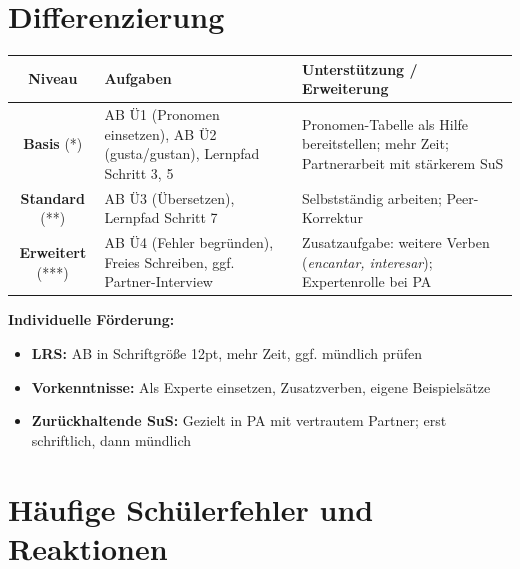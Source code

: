 \documentclass[10pt, a4paper]{article}
\newcommand{\es}[1]{\textcolor{spanisch}{\textit{#1}}}
\begin{document}

\section{Differenzierung}

\begin{tabularx}{\textwidth}{|c|X|X|}
    \hline
    \textbf{Niveau} & \textbf{Aufgaben} & \textbf{Unterstützung / Erweiterung} \\
    \hline
    \textbf{Basis} (*) & AB Ü1 (Pronomen einsetzen), AB Ü2 (gusta/gustan), Lernpfad Schritt 3, 5 &
    Pronomen-Tabelle als Hilfe bereitstellen; mehr Zeit; Partnerarbeit mit stärkerem SuS \\
    \hline
    \textbf{Standard} (**) & AB Ü3 (Übersetzen), Lernpfad Schritt 7 &
    Selbstständig arbeiten; Peer-Korrektur \\
    \hline
    \textbf{Erweitert} (***) & AB Ü4 (Fehler begründen), Freies Schreiben, ggf. Partner-Interview &
    Zusatzaufgabe: weitere Verben (\es{encantar, interesar}); Expertenrolle bei PA \\
    \hline
\end{tabularx}

\vspace{6pt}

\textbf{Individuelle Förderung:}
\begin{itemize}[nosep, leftmargin=1.5em]
    \item \textbf{LRS:} AB in Schriftgröße 12pt, mehr Zeit, ggf. mündlich prüfen
    \item \textbf{Vorkenntnisse:} Als Experte einsetzen, Zusatzverben, eigene Beispielsätze
    \item \textbf{Zurückhaltende SuS:} Gezielt in PA mit vertrautem Partner; erst schriftlich, dann mündlich
\end{itemize}


\section{Häufige Schülerfehler und Reaktionen}
\end{document}
